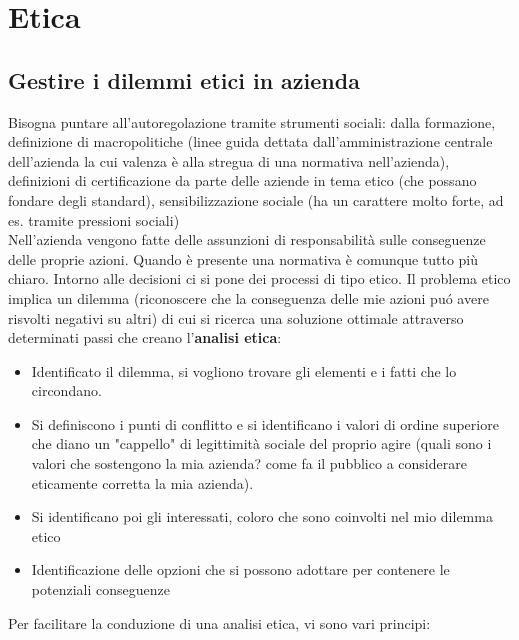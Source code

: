 \chapter{Etica}

\section{Gestire i dilemmi etici in azienda}
Bisogna puntare all'autoregolazione tramite strumenti sociali: dalla
formazione, definizione di macropolitiche (linee guida dettata
dall'amministrazione centrale dell'azienda la cui valenza \`e alla stregua
di una normativa nell'azienda), definizioni di certificazione da parte
delle aziende in tema etico (che possano fondare degli standard),
sensibilizzazione sociale (ha un carattere molto forte, ad es. tramite
pressioni sociali)\\
Nell'azienda vengono fatte delle assunzioni di responsabilit\`a sulle
conseguenze delle proprie azioni. Quando è presente una normativa è comunque 
tutto più chiaro. Intorno alle decisioni ci si pone dei
processi di tipo etico. Il problema etico implica un dilemma
(riconoscere che la conseguenza delle mie azioni pu\'o avere risvolti
negativi su altri) di cui si ricerca una soluzione ottimale attraverso
determinati passi che creano l'\textbf{analisi etica}:

\begin{itemize}

\item
  Identificato il dilemma, si vogliono trovare gli elementi e i fatti
  che lo circondano.\\
\item
  Si definiscono i punti di conflitto e si identificano i valori di
  ordine superiore che diano un "cappello" di legittimit\`a sociale del
  proprio agire (quali sono i valori che sostengono la mia azienda? come
  fa il pubblico a considerare eticamente corretta la mia azienda).\\
\item
  Si identificano poi gli interessati, coloro che sono coinvolti nel mio
  dilemma etico\\
\item
  Identificazione delle opzioni che si possono adottare per contenere le
  potenziali conseguenze
\end{itemize}

Per facilitare la conduzione di una analisi etica, vi sono vari
principi:

